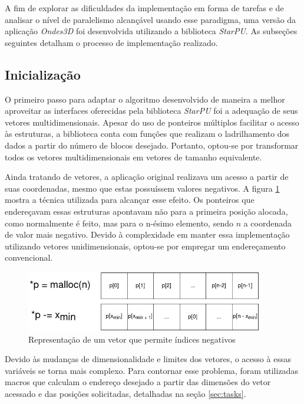 \documentclass[cic,tc]{iiufrgs}
\begin{document}
A fim de explorar as dificuldades da implementação em forma de tarefas e de analisar o nível de paralelismo alcançável usando esse paradigma, uma versão da aplicação \textit{Ondes3D} foi
desenvolvida utilizando a biblioteca \textit{StarPU}. As subseções seguintes detalham o processo de implementação realizado.

\subsection{Inicialização}

O primeiro passo para adaptar o algoritmo desenvolvido de maneira a melhor aproveitar as interfaces oferecidas pela biblioteca \textit{StarPU} foi a adequação de seus vetores multidimensionais. Apesar
do uso de ponteiros múltiplos facilitar o acesso às estruturas, a biblioteca conta com funções que realizam o ladrilhamento dos dados a partir do número de blocos desejado. Portanto, optou-se por
transformar todos os vetores multidimensionais em vetores de tamanho equivalente.

Ainda tratando de vetores, a aplicação original realizava um acesso a partir de suas coordenadas, mesmo que estas possuíssem valores negativos. A figura \ref{fig:negative_index} mostra a
técnica utilizada para alcançar esse efeito. Os ponteiros que endereçavam essas estruturas apontavam não para a primeira posição alocada, como normalmente é feito, mas para o n-ésimo elemento,
sendo $n$ a coordenada de valor mais negativo. Devido à complexidade em manter essa implementação utilizando vetores unidimensionais, optou-se por empregar um endereçamento convencional.

\begin{figure}[!htb]
    \caption{Representação de um vetor que permite índices negativos}
    \begin{center}
      \includegraphics[width=28em]{negative_index}
    \end{center}
    \label{fig:negative_index}
\end{figure}

Devido às mudanças de dimensionalidade e limites dos vetores, o acesso à essas variáveis se torna mais complexo. Para contornar esse problema, foram utilizadas macros que calculam o endereço desejado a partir das dimensões do vetor acessado e das posições solicitadas, detalhadas na seção \ref{sec:tasks}.
\end{document}
